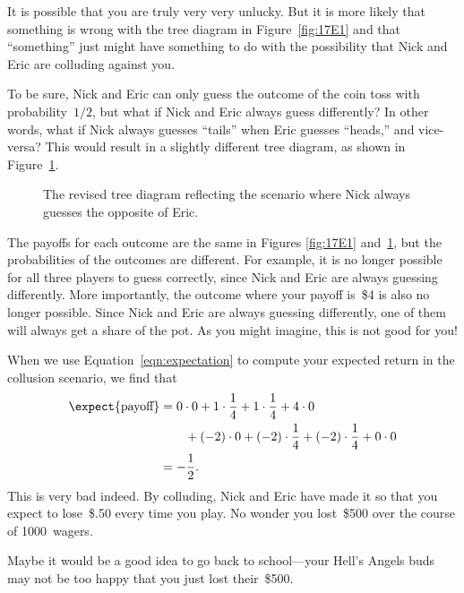 It is possible that you are truly very very unlucky.  But it is more
likely that something is wrong with the tree diagram in
Figure~\ref{fig:17E1} and that ``something'' just might have
something to do with the possibility that Nick and Eric are colluding
against you.

To be sure, Nick and Eric can only guess the outcome of the coin toss
with probability~$1/2$, but what if Nick and Eric always guess
differently?  In other words, what if Nick always guesses ``tails''
when Eric guesses ``heads,'' and vice-versa?  This would result in a
slightly different tree diagram, as shown in Figure~\ref{fig:17E2}.

\begin{figure}



\caption{The revised tree diagram reflecting the scenario where Nick
  always guesses the opposite of Eric.}

\label{fig:17E2}

\end{figure}

The payoffs for each outcome are the same in Figures \ref{fig:17E1}
and~\ref{fig:17E2}, but the probabilities of the outcomes are
different.  For example, it is no longer possible for all three
players to guess correctly, since Nick and Eric are always guessing
differently.  More importantly, the outcome where your payoff is~\$4
is also no longer possible.  Since Nick and Eric are always guessing
differently, one of them will always get a share of the pot.  As you
might imagine, this is not good for you!

When we use Equation~\ref{eqn:expectation} to compute your expected
return in the collusion scenario, we find that
\begin{align*}
\expect{\text{payoff}}
    &= 0 \cdot 0 + 1 \cdot \frac{1}{4} + 1 \cdot \frac{1}{4}
        + 4 \cdot 0 \\
        & \qquad {}+ (-2) \cdot 0 + (-2) \cdot \frac{1}{4}
        + (-2) \cdot \frac{1}{4}
        + 0 \cdot 0 \\
    &= -\frac{1}{2}.
\end{align*}
This is very bad indeed.  By colluding, Nick and Eric have made it so
that you expect to lose~\$.50 every time you play.  No wonder you
lost~\$500 over the course of 1000~wagers.  

Maybe it would be a good idea to go back to school---your Hell's
Angels buds may not be too happy that you just lost their~\$500.


